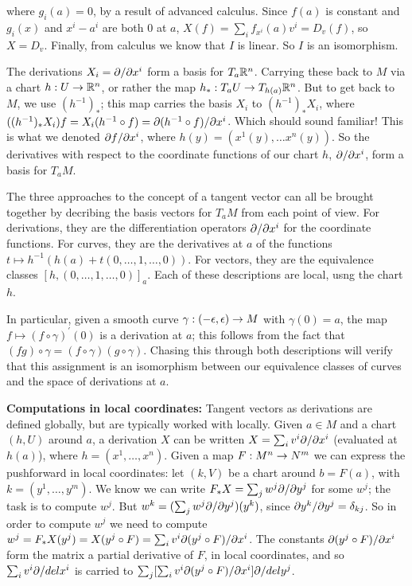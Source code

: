 \ssk

\noindent where $g_i(a)=0$, by a result of advanced calculus. Since $f(a)$ is constant and
$g_i(x)$ and $x^i-a^i$ are both $0$ at $a$, $X(f)=\sum_i f_{x^i}(a)v^i=D_v(f)$, so $X=D_v$.
Finally, from calculus we know that $I$ is linear. So $I$ is an isomorphism.

\msk

The derivations $X_i=\partial/\partial x^i$ form a basis for $T_a{\Bbb R}^n$. Carrying these back to $M$ via 
a chart $h:U\rightarrow{\Bbb R}^n$, or rather the map $h_*:T_aU\rightarrow T_{h(a)}{\Bbb R}^n$. But to get back
to $M$, we use $(h^{-1})_*$;  this map carries the basis $X_i$ to
$(h^{-1})_*X_i$, where $((h^{-1})_*X_i)f=X_i(h^{-1}\circ f)=\partial(h^{-1}\circ f)/\partial x^i$.
Which should sound familiar! This is what we denoted $\partial f/\partial x^i$, where 
$h(y)=(x^1(y),\ldots x^n(y))$. So the derivatives with respect to the coordinate functions
of our chart $h$, $\partial/\partial x^i$, form a basis for $T_aM$. 

\ssk

The three approaches to the concept of a tangent vector can all be brought together by decribing
the basis vectors for $T_aM$ from each point of view. For derivations, they are the differentiation
operators $\partial/\partial x^i$ for the coordinate functions. For curves, they are the derivatives
at $a$ of the functions $t\mapsto h^{-1}(h(a)+t(0,\ldots ,1,\ldots ,0))$. For vectors, they
are the equivalence classes $[h,(0,\ldots ,1,\ldots ,0)]_a$. Each of these descriptions are
local, usng the chart $h$.

In particular, given a smooth curve $\gamma:(-\epsilon,\epsilon)\rightarrow M$ with $\gamma(0)=a$,
the map $f\mapsto (f\circ \gamma)^\prime(0)$ is a derivation at $a$; this follows
from the fact that $(fg)\circ\gamma = (f\circ\gamma)(g\circ\gamma)$. Chasing this through
both descriptions will verify that this assignment is an isomorphism between our 
equivalence classes of curves and the space of derivations at $a$.

\msk

{\bf Computations in local coordinates:} Tangent vectors as derivations are defined globally, 
but are typically worked with locally. Given $a\in M$ and a chart $(h,U)$ around $a$, 
a derivation $X$ can be written $X=\sum_i v^i\partial/\partial x^i$ (evaluated at $h(a)$), 
where $h=(x^1,\ldots ,x^n)$.
Given a map $F:M^n\rightarrow N^m$ we can express the pushforward in local coordinates: let 
$(k,V)$ be a chart around $b=F(a)$, with $k=(y^1,\ldots ,y^m)$. We know we can write 
$F_*X=\sum_j w^j\partial/\partial y^j$ for some $w^j$; the task is to compute $w^j$. But
$w^k=(\sum_j w^j\partial/\partial y^j)(y^k)$, since $\partial y^k/\partial y^j=\delta_{kj}$.
So in order to compute $w^j$ we need to compute 
$w^j=F_*X(y^j)= X(y^j\circ F) = \sum_i v^i\partial(y^j\circ F)/\partial x^i$.
The constants $\partial(y^j\circ F)/\partial x^i$ form the matrix a partial derivative of $F$, 
in local coordinates, and so $\sum_i v^i\partial/del x^i$ is carried to 
$\sum_j[\sum_i v^i\partial(y^j\circ F)/\partial x^i]\partial/del y^j$. 


